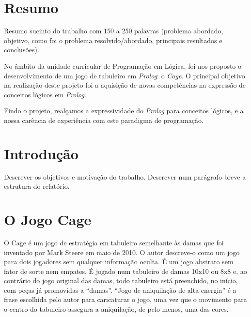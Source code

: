 \documentclass[a4paper]{article}
\begin{document}

\newpage

\section*{Resumo}
Resumo sucinto do trabalho com 150 a 250 palavras (problema abordado, objetivo, como foi o problema resolvido/abordado, principais resultados e conclusões).

No âmbito da unidade curricular de Programação em Lógica, foi-nos proposto o desenvolvimento de um jogo de tabuleiro em \emph{Prolog}: o \emph{Cage}. O principal objetivo na realização deste projeto foi a aquisição de novas competências na expressão de conceitos lógicos em \emph{Prolog}.

Findo o projeto, realçamos a expressividade do \emph{Prolog} para conceitos lógicos, e a nossa carência de experiência com este paradigma de programação.

\newpage

\tableofcontents



\newpage

\section{Introdução}

Descrever os objetivos e motivação do trabalho. Descrever num parágrafo breve a estrutura do relatório.


\section{O Jogo Cage}

O Cage é um jogo de estratégia em tabuleiro semelhante às damas que foi inventado por Mark Steere em maio de 2010. O autor descreve-o como um jogo para dois jogadores sem qualquer informação oculta. É um jogo abstrato sem fator de sorte nem empates. É jogado num tabuleiro de damas 10x10 ou 8x8 e, ao contrário do jogo original das damas, todo tabuleiro está preenchido, no início, com peças já promovidas a ``damas''. ``Jogo de aniquilação de alta energia'' é a frase escolhida pelo autor para caricaturar o jogo, uma vez que o movimento para o centro do tabuleiro assegura a aniquilação, de pelo menos, uma das cores.
\end{document}

